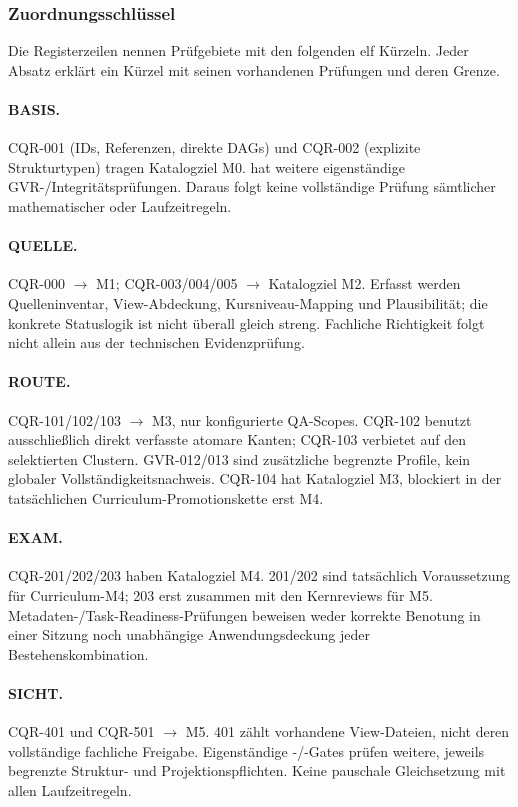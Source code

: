 \subsubsection*{Zuordnungsschlüssel}
Die Registerzeilen nennen Prüfgebiete mit den folgenden elf Kürzeln. Jeder Absatz erklärt ein Kürzel mit seinen vorhandenen Prüfungen und deren Grenze.

\paragraph{BASIS.} CQR-001 (IDs, Referenzen, direkte DAGs) und CQR-002 (explizite Strukturtypen) tragen Katalogziel M0.  hat weitere eigenständige GVR-/Integritätsprüfungen. Daraus folgt keine vollständige Prüfung sämtlicher mathematischer oder Laufzeitregeln.
\paragraph{QUELLE.} CQR-000 \ensuremath{\to} M1; CQR-003/004/005 \ensuremath{\to} Katalogziel M2. Erfasst werden Quelleninventar, View-Abdeckung, Kursniveau-Mapping und Plausibilität; die konkrete Statuslogik ist nicht überall gleich streng. Fachliche Richtigkeit folgt nicht allein aus der technischen Evidenzprüfung.
\paragraph{ROUTE.} CQR-101/102/103 \ensuremath{\to} M3, nur konfigurierte QA-Scopes. CQR-102 benutzt ausschließlich direkt verfasste atomare Kanten; CQR-103 verbietet  auf den selektierten Clustern. GVR-012/013 sind zusätzliche begrenzte Profile, kein globaler Vollständigkeitsnachweis. CQR-104 hat Katalogziel M3, blockiert in der tatsächlichen Curriculum-Promotionskette erst M4.
\paragraph{EXAM.} CQR-201/202/203 haben Katalogziel M4. 201/202 sind tatsächlich Voraussetzung für Curriculum-M4; 203 erst zusammen mit den Kernreviews für M5. Metadaten-/Task-Readiness-Prüfungen beweisen weder korrekte Benotung in einer Sitzung noch unabhängige Anwendungsdeckung jeder Bestehenskombination.
\paragraph{SICHT.} CQR-401 und CQR-501 \ensuremath{\to} M5. 401 zählt vorhandene View-Dateien, nicht deren vollständige fachliche Freigabe. Eigenständige -/-Gates prüfen weitere, jeweils begrenzte Struktur- und Projektionspflichten. Keine pauschale Gleichsetzung mit allen Laufzeitregeln.
